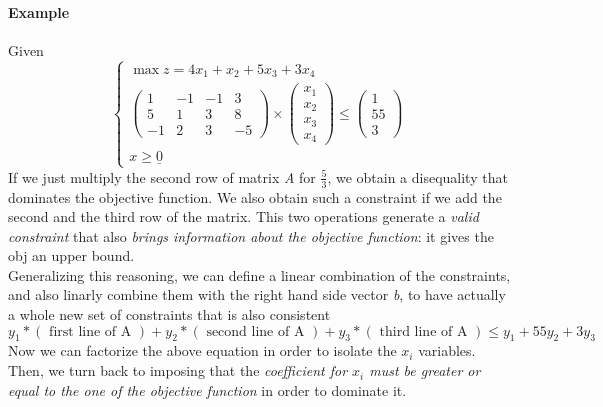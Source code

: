 \documentclass{article}
\begin{document}
				\paragraph{Example}
					Given
					\begin{equation}
						\begin{cases}
							\max z = 4x_1+x_2+5x_3+3x_4 \\
							\begin{pmatrix}
								1 & -1 & -1 & 3 \\
								5 & 1 & 3 & 8 \\
								-1 & 2 & 3 & -5
							\end{pmatrix}
							\times
							\begin{pmatrix}x_1 \\ x_2 \\ x_3 \\ x_4\end{pmatrix}
							\leq
							\begin{pmatrix}1 \\ 55 \\ 3\end{pmatrix} \\
							x \geq \underline{0} 
						\end{cases}
					\end{equation}
					If we just multiply the second row of matrix \emph{A} for $\frac{5}{3}$, we obtain a disequality that dominates the objective function. We also obtain such a constraint if we add the second and the third row of the matrix. This two operations generate a \textit{valid constraint} that also \textit{brings information about the objective function}: it gives the obj an upper bound.\\
					Generalizing this reasoning, we can define a linear combination of the constraints, and also linarly combine them with the right hand side vector \emph{b}, to have actually a whole new set of constraints that is also consistent
					\begin{equation}
						y_1 * (\text{ first line of A }) + y_2 * (\text{ second line of A }) + y_3 * (\text{ third line of A }) \leq y_1 + 55y_2 + 3y_3
					\end{equation}
					Now we can factorize the above equation in order to isolate the $x_i$ variables. Then, we turn back to imposing that the \textit{coefficient for $x_i$ must be greater or equal to the one of the objective function} in order to dominate it.
\end{document}
